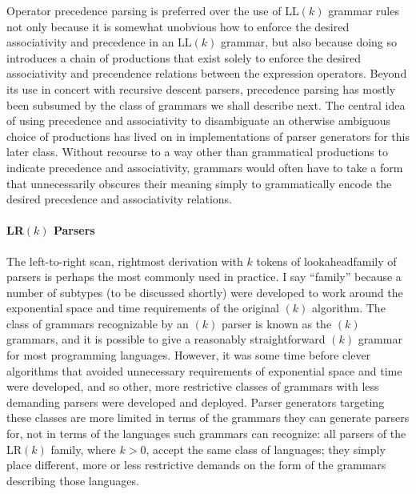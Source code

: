 Operator precedence parsing is preferred over the use of LL$(k)$ grammar rules not only because it is somewhat unobvious how to enforce the desired associativity and precedence in an LL$(k)$ grammar, but also because doing so introduces a chain of productions that exist solely to enforce the desired associativity and precendence relations between the expression operators. Beyond its use in concert with recursive descent parsers, precedence parsing has mostly been subsumed by the class of grammars we shall describe next. The central idea of using precedence and associativity to disambiguate an otherwise ambiguous choice of productions has lived on in implementations of parser generators for this later class. Without recourse to a way other than grammatical productions to indicate precedence and associativity, grammars would often have to take a form that unnecessarily obscures their meaning simply to grammatically encode the desired precedence and associativity relations.

\paragraph{LR$(k)$ Parsers}
The \empause left-to-right scan, rightmost derivation with $k$ tokens of lookahead\empause family of parsers is perhaps the most commonly used in practice. I say ``family'' because a number of subtypes (to be discussed shortly) were developed to work around the exponential space and time requirements of the original $(k)$ algorithm. The class of grammars recognizable by an $(k)$ parser is known as the $(k)$ grammars, and it is possible to give a reasonably straightforward $(k)$ grammar for most programming languages. However, it was some time before clever algorithms that avoided unnecessary requirements of exponential space and time were developed, and so other, more restrictive classes of grammars with less demanding parsers were developed and deployed. Parser generators targeting these classes are more limited in terms of the grammars they can generate parsers for, not in terms of the languages such grammars can recognize: all parsers of the LR$(k)$ family, where $k > 0$, accept the same class of languages; they simply place different, more or less restrictive demands on the form of the grammars describing those languages. %

